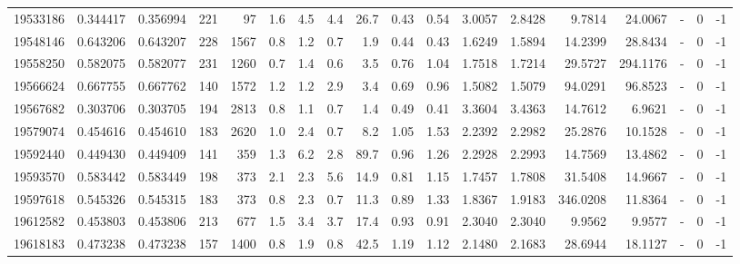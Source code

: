 \begin{tabular}{rrrrrrrrrrrrrrrlrr}
  19533186 & 0.344417 &   0.356994 &  221 &   97 &      1.6 &      4.5 &     4.4 &     26.7 &       0.43 &        0.54 &  3.0057 &  2.8428 &    9.7814 &   24.0067 &             - &        0 &         -1 \\
  19548146 & 0.643206 &   0.643207 &  228 & 1567 &      0.8 &      1.2 &     0.7 &      1.9 &       0.44 &        0.43 &  1.6249 &  1.5894 &   14.2399 &   28.8434 &             - &        0 &         -1 \\
  19558250 & 0.582075 &   0.582077 &  231 & 1260 &      0.7 &      1.4 &     0.6 &      3.5 &       0.76 &        1.04 &  1.7518 &  1.7214 &   29.5727 &  294.1176 &             - &        0 &         -1 \\
  19566624 & 0.667755 &   0.667762 &  140 & 1572 &      1.2 &      1.2 &     2.9 &      3.4 &       0.69 &        0.96 &  1.5082 &  1.5079 &   94.0291 &   96.8523 &             - &        0 &         -1 \\
  19567682 & 0.303706 &   0.303705 &  194 & 2813 &      0.8 &      1.1 &     0.7 &      1.4 &       0.49 &        0.41 &  3.3604 &  3.4363 &   14.7612 &    6.9621 &             - &        0 &         -1 \\
  19579074 & 0.454616 &   0.454610 &  183 & 2620 &      1.0 &      2.4 &     0.7 &      8.2 &       1.05 &        1.53 &  2.2392 &  2.2982 &   25.2876 &   10.1528 &             - &        0 &         -1 \\
  19592440 & 0.449430 &   0.449409 &  141 &  359 &      1.3 &      6.2 &     2.8 &     89.7 &       0.96 &        1.26 &  2.2928 &  2.2993 &   14.7569 &   13.4862 &             - &        0 &         -1 \\
  19593570 & 0.583442 &   0.583449 &  198 &  373 &      2.1 &      2.3 &     5.6 &     14.9 &       0.81 &        1.15 &  1.7457 &  1.7808 &   31.5408 &   14.9667 &             - &        0 &         -1 \\
  19597618 & 0.545326 &   0.545315 &  183 &  373 &      0.8 &      2.3 &     0.7 &     11.3 &       0.89 &        1.33 &  1.8367 &  1.9183 &  346.0208 &   11.8364 &             - &        0 &         -1 \\
  19612582 & 0.453803 &   0.453806 &  213 &  677 &      1.5 &      3.4 &     3.7 &     17.4 &       0.93 &        0.91 &  2.3040 &  2.3040 &    9.9562 &    9.9577 &             - &        0 &         -1 \\
  19618183 & 0.473238 &   0.473238 &  157 & 1400 &      0.8 &      1.9 &     0.8 &     42.5 &       1.19 &        1.12 &  2.1480 &  2.1683 &   28.6944 &   18.1127 &             - &        0 &         -1 \\

\end{tabular}
